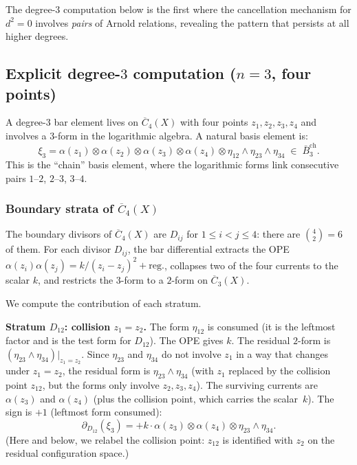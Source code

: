 The degree-$3$ computation below is the first where the cancellation
mechanism for $d^2 = 0$ involves \emph{pairs} of Arnold relations,
revealing the pattern that persists at all higher degrees.

\subsection{\texorpdfstring{Explicit degree-$3$ computation ($n = 3$, four points)}{Explicit degree-3 computation (n = 3, four points)}}
\label{subsec:frame-degree3}

A degree-$3$ bar element lives on $\overline{C}_4(X)$ with four
points $z_1, z_2, z_3, z_4$ and involves a $3$-form in the
logarithmic algebra. A natural basis element is:
\begin{equation}\label{eq:frame-bar3-element}
\xi_3 = \alpha(z_1) \otimes \alpha(z_2) \otimes \alpha(z_3)
 \otimes \alpha(z_4)
 \otimes \eta_{12} \wedge \eta_{23} \wedge \eta_{34}
 \;\in\; \bar{B}^{\mathrm{ch}}_3.
\end{equation}
This is the ``chain'' basis element, where the logarithmic forms
link consecutive pairs $1$--$2$, $2$--$3$, $3$--$4$.

\subsubsection*{Boundary strata of $\overline{C}_4(X)$}

The boundary divisors of $\overline{C}_4(X)$ are $D_{ij}$ for
$1 \leq i < j \leq 4$: there are $\binom{4}{2} = 6$ of them.
For each divisor $D_{ij}$, the bar differential extracts the
OPE $\alpha(z_i)\alpha(z_j) = k/(z_i - z_j)^2 + \mathrm{reg.}$,
collapses two of the four currents to the scalar $k$, and restricts
the $3$-form to a $2$-form on $\overline{C}_3(X)$.

We compute the contribution of each stratum.

\medskip
\noindent\textbf{Stratum $D_{12}$: collision $z_1 = z_2$.}
The form $\eta_{12}$ is consumed (it is the leftmost factor and
is the test form for $D_{12}$). The OPE gives $k$. The residual
$2$-form is $(\eta_{23} \wedge \eta_{34})|_{z_1 = z_2}$. Since
$\eta_{23}$ and $\eta_{34}$ do not involve $z_1$ in a way that
changes under $z_1 = z_2$, the residual form is
$\eta_{23} \wedge \eta_{34}$ (with $z_1$ replaced by the
collision point $z_{12}$, but the forms only involve $z_2, z_3, z_4$).
The surviving currents are $\alpha(z_3)$ and $\alpha(z_4)$
(plus the collision point, which carries the scalar~$k$).
The sign is $+1$ (leftmost form consumed):
\begin{equation}\label{eq:frame-D12-deg3}
\partial_{D_{12}}(\xi_3)
= +k \cdot \alpha(z_3) \otimes \alpha(z_4)
 \otimes \eta_{23} \wedge \eta_{34}.
\end{equation}
(Here and below, we relabel the collision point: $z_{12}$ is
identified with $z_2$ on the residual configuration space.)

